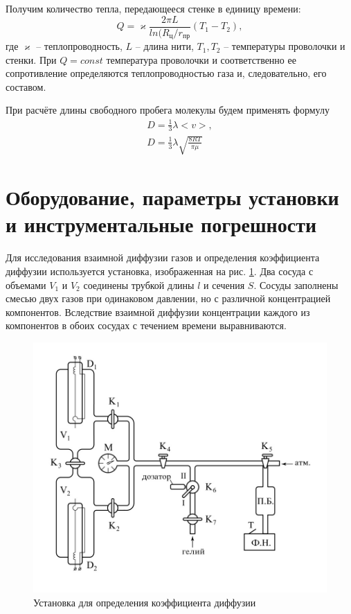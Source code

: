 \documentclass[a4paper]{article}
\begin{document}
Получим количество тепла, передающееся стенке в единицу времени:
\begin{equation}
Q = \varkappa \frac{2 \pi L}{ln(R_ц / r_{пр}} (T_1 - T_2),
\label{eq:Warmth}
\end{equation}
где $\varkappa$ -- теплопроводность, $L$ -- длина нити, $T_1, T_2$ -- температуры проволочки и стенки. При $Q = const$ температура проволочки и соответственно ее сопротивление определяются теплопроводностью газа и, следовательно, его составом.

При расчёте длины свободного пробега молекулы будем применять формулу
\begin{eqnarray}
D = \frac{1}{3} \lambda <v>, \\
D = \frac{1}{3} \lambda \sqrt{\frac{8 R T}{\pi \mu}}
\label{eq:ДиффузияИПробег}
\end{eqnarray}

\section{Оборудование, параметры установки и инструментальные погрешности}
Для исследования взаимной диффузии газов и определения коэффициента диффузии используется установка, изображенная на рис. \ref{fig:Установка}. Два сосуда с объемами $V_1$ и $V_2$ соединены трубкой длины $l$ и сечения $S$. Сосуды заполнены смесью двух газов при одинаковом давлении, но с различной концентрацией компонентов. Вследствие взаимной диффузии концентрации каждого из компонентов в обоих сосудах с течением времени выравниваются.
\begin{figure}
	\centering
		\includegraphics[width=1.00\textwidth]{1.jpg}
	\caption{Установка для определения коэффициента диффузии}
	\label{fig:Установка}
\end{figure}
\end{document}
